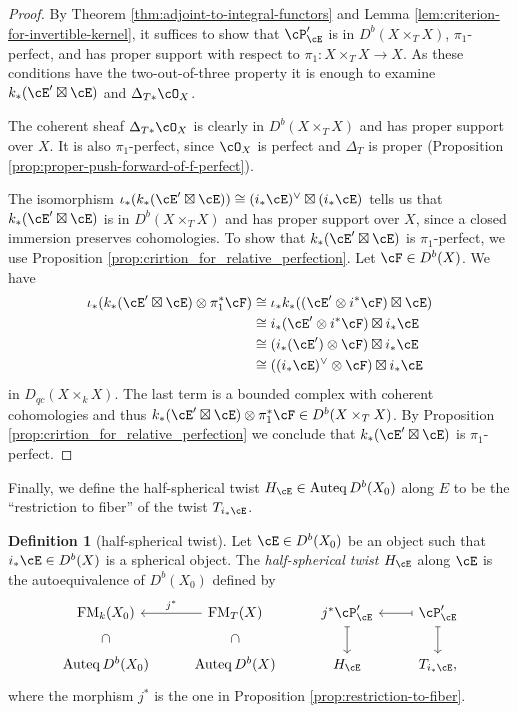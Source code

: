 \documentclass[12pt]{amsart}
\numberwithin{equation}{section}
\theoremstyle{plain}
\theoremstyle{definition}
\newtheorem{definition}[theorem]{Definition}
\DeclareMathOperator{\Auteq}{\mathrm{Auteq}}
\DeclareMathOperator{\FM}{\mathrm{FM}}
\begin{document}
\begin{proof}
    By Theorem \ref{thm:adjoint-to-integral-functors} and Lemma \ref{lem:criterion-for-invertible-kernel}, it suffices to show that $\cP'_{\cE}$ is in $D^b(X \times_T X)$, $\pi_1$-perfect, and has proper support with respect to $\pi_1 \colon X \times_T X \to X$.
    As these conditions have the two-out-of-three property it is enough to examine $k_*(\cE' \boxtimes \cE)$ and $\Delta_{T*}\cO_X$.

    The coherent sheaf $\Delta_{T*}\cO_X$ is clearly in $D^b(X \times_T X)$ and has proper support over $X$.
    It is also $\pi_1$-perfect, since $\cO_X$ is perfect and $\Delta_{T}$ is proper (Proposition \ref{prop:proper-push-forward-of-f-perfect}).

    The isomorphism $\iota_*(k_*(\cE' \boxtimes \cE)) \cong (i_*{\cE})^\vee\boxtimes (i_*{\cE})$ tells us that $k_*(\cE' \boxtimes \cE)$ is in $D^b(X \times_T X)$ and has proper support over $X$, since a closed immersion preserves cohomologies.
    To show that $k_*(\cE' \boxtimes \cE)$ is $\pi_1$-perfect, we use Proposition \ref{prop:crirtion_for_relative_perfection}.
    Let $\cF \in D^b(X)$.
    We have
    \begin{align}
        \iota_*(k_*(\cE' \boxtimes \cE) \otimes \pi_1^*\cF) & \cong \iota_*k_*((\cE' \otimes i^*\cF) \boxtimes \cE)  \\
                                                            & \cong i_*(\cE' \otimes i^*\cF) \boxtimes i_*{\cE}      \\
                                                            & \cong (i_*(\cE') \otimes \cF) \boxtimes i_*{\cE}       \\
                                                            & \cong ((i_*{\cE})^\vee \otimes \cF) \boxtimes i_*{\cE}
    \end{align}
    in $D_{qc}(X \times_k X)$.
    The last term is a bounded complex with coherent cohomologies and thus $k_*(\cE' \boxtimes \cE) \otimes \pi_1^*\cF \in D^b(X \times_T X)$.
    By Proposition \ref{prop:crirtion_for_relative_perfection} we conclude that $k_*(\cE' \boxtimes \cE)$ is $\pi_1$-perfect.
\end{proof}
Finally, we define the half-spherical twist $H_{\cE} \in \Auteq D^b(X_0)$ along $E$ to be the ``restriction to fiber'' of the twist $T_{i_*{\cE}}$.
\begin{definition}[half-spherical twist]\label{def:half-spherical-twist}
    Let $\cE \in D^b(X_0)$ be an object such that $i_*{\cE} \in D^b(X)$ is a spherical object.
    The \emph{half-spherical twist $H_{\cE}$} along $\cE$ is the autoequivalence of $D^b(X_0)$ defined by
    \[
        \begin{tikzcd}
            \FM_k(X_0) \ar[d, phantom, sloped, "\subset"] & \FM_T(X)\ar[l, "j^*"']\ar[d, phantom, sloped, "\subset"] & j^*\cP'_{\cE} \ar[d, mapsto]& \cP'_{\cE} \ar[l, mapsto] \ar[d, mapsto]\\
            \Auteq D^b(X_0) & \Auteq D^b(X) & H_{\cE} & T_{i_*{\cE}},
        \end{tikzcd}
    \]
    where the morphism $j^*$ is the one in Proposition \ref{prop:restriction-to-fiber}.
\end{definition}
\end{document}
